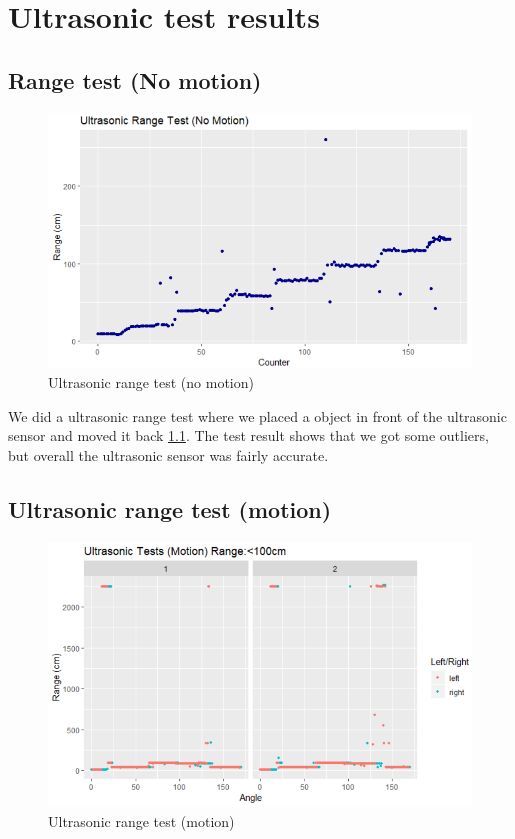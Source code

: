 
\chapter{Ultrasonic test results}

\section{Range test (No motion)} 

\begin{figure} [h!]
  \includegraphics[width=\linewidth]{fig/test1}
  \caption{Ultrasonic range test (no motion)}
  \label{fig:test1}
\end{figure}

We did a ultrasonic range test where we placed a object in front of the ultrasonic sensor and moved it back \ref{fig:test1}. The test result shows that we got some outliers, but overall the ultrasonic sensor was fairly accurate.

\newpage

\section{Ultrasonic range test (motion)} 

\begin{figure} [h!]
  \includegraphics[width=\linewidth]{fig/test2}
  \caption{Ultrasonic range test (motion)}
  \label{fig:test2}
\end{figure}

